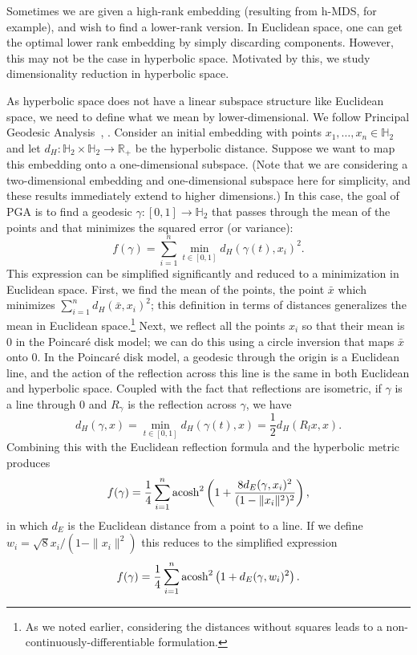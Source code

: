 Sometimes we are given a
high-rank embedding (resulting from h-MDS, for example), and wish to
find a lower-rank version.
In Euclidean space, one can get the optimal
lower rank embedding by simply discarding components. However, this
may not be the case in hyperbolic space.
Motivated by this, we study dimensionality reduction in hyperbolic space.

As hyperbolic space does not have a linear subspace structure like
Euclidean space, we need to define what we mean by lower-dimensional.
We follow Principal Geodesic Analysis~\cite{PGA}, \cite{GPCA}. Consider an initial
embedding with points $x_1,\dots,x_n \in \mathbb{H}_2$ and let $d_{H}
: \mathbb{H}_2 \times \mathbb{H}_2 \to \mathbb{R}_{+}$ be the hyperbolic distance.
Suppose we want to map this embedding onto a one-dimensional subspace. (Note that
we are considering a two-dimensional embedding and one-dimensional subspace
here for simplicity, and these
results immediately extend to higher dimensions.) In this case, the goal of PGA
is to find a geodesic $\gamma :
[0,1] \to \mathbb{H}_2$ that passes through the mean of the points and that minimizes the squared error (or variance):
\[ f(\gamma) = \sum_{i=1}^n \min_{t \in [0,1]} d_{H}(\gamma(t),x_i)^2 .\]
This expression can be simplified significantly and reduced to a
minimization in Euclidean space.  First, we find the mean of the
points, the point $\bar x$ which minimizes $\sum_{i=1}^n d_{H}(\bar
x, x_i)^2$; this definition in terms of distances generalizes the mean in Euclidean space.\footnote{As we noted earlier, considering the distances
without squares leads to a non-continuously-differentiable
formulation.}  Next, we reflect all the points $x_i$ so that their
mean is $0$ in the Poincar{\'e} disk model; we can do this using a
circle inversion that maps $\bar x$ onto $0$.
In the Poincar{\'e} disk model, a geodesic through
the origin is a Euclidean line, and the action of the reflection across
this line is the same in both Euclidean and hyperbolic space. Coupled
with the fact that reflections are isometric, if $\gamma$ is a line
through $0$ and $R_\gamma$ is the reflection across $\gamma$, we have
\[
  d_H(\gamma, x) = \min_{t \in [0,1]} d_H(\gamma(t), x) = \frac{1}{2} d_H(R_l x, x).
\]
Combining this with the Euclidean reflection formula and the hyperbolic metric produces
\[
  f(\gamma) = \frac{1}{4} \sum_{i=1}^n \operatorname{acosh}^2\left( 1 + \frac{ 8 d_{E}(\gamma,x_i)^2 }{(1 - \| x_i \|^2)^2} \right),
\]
in which $d_{E}$ is the Euclidean distance from a point to a line. If
we define $w_i = \sqrt{8} x_i / (1 - \| x_i \|^2)$ this reduces to the simplified expression
\[
  f(\gamma) = \frac{1}{4} \sum_{i=1}^n \operatorname{acosh}^2\left( 1 + d_{E}(\gamma,w_i)^2 \right).
\]
  
